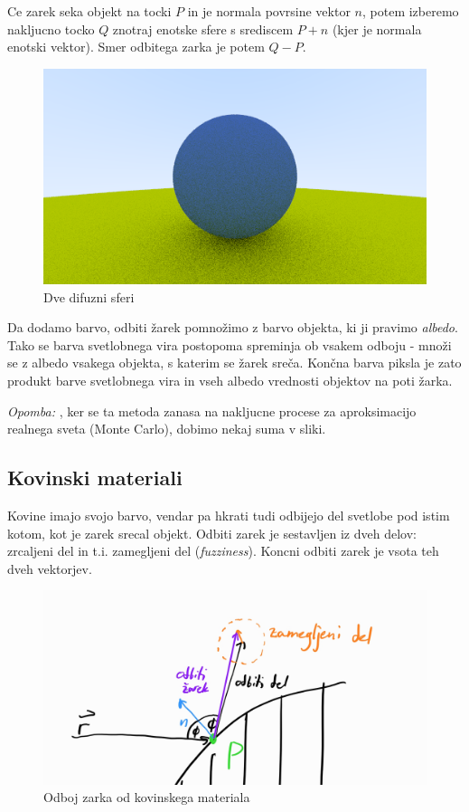 \documentclass[12pt, a4paper]{article}
\begin{document}
Ce zarek seka objekt na tocki $P$ in je normala povrsine vektor $n$, potem izberemo nakljucno tocko $Q$
znotraj enotske sfere s srediscem $P + n$ (kjer je normala enotski vektor). Smer odbitega zarka je potem
$Q - P$.

\begin{figure}[H]
	\centering
	\includegraphics[width=400pt]{difuzni}
	\caption{Dve difuzni sferi}
\end{figure}

Da dodamo barvo, odbiti žarek pomnožimo z barvo objekta, ki ji pravimo \textit{albedo}. Tako se barva
svetlobnega vira postopoma spreminja ob vsakem odboju - množi se z albedo vsakega objekta, s katerim se
žarek sreča. Končna barva piksla je zato produkt barve svetlobnega vira in vseh albedo vrednosti
objektov na poti žarka.

\textit{Opomba: }, ker se ta metoda zanasa na nakljucne procese za aproksimacijo realnega sveta (Monte Carlo),
dobimo nekaj suma v sliki.

\subsection{Kovinski materiali}

Kovine imajo svojo barvo, vendar pa hkrati tudi odbijejo del svetlobe pod istim kotom, kot je
zarek srecal objekt. Odbiti zarek je sestavljen iz dveh delov: zrcaljeni del in t.i. zamegljeni del
(\textit{fuzziness}). Koncni odbiti zarek je vsota teh dveh vektorjev.

\begin{figure}[H]
	\centering
	\includegraphics[width=400pt]{metal}
	\caption{Odboj zarka od kovinskega materiala}
\end{figure}
\end{document}
